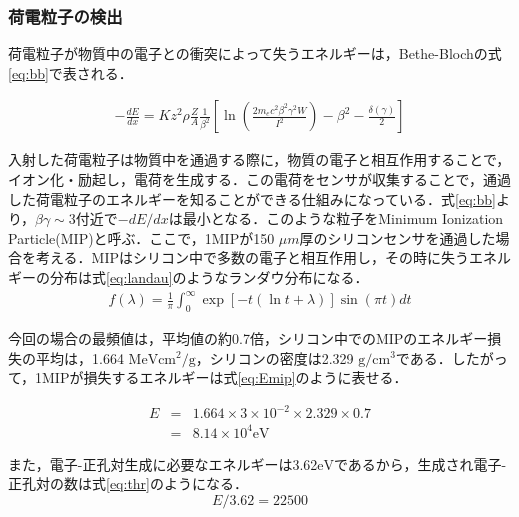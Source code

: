 \subsubsection*{荷電粒子の検出}
荷電粒子が物質中の電子との衝突によって失うエネルギーは，Bethe-Blochの式\ref{eq:bb}で表される．\par
\begin{eqnarray}
  \label{eq:bb}
  - \frac{dE}{dx} = K z^2 \rho \frac{Z}{A} \frac{1}{\beta^2} \left[ \ln \left( \frac{2m_e c^2 \beta^2 \gamma^2 W}{I^2} \right) - \beta^2 - \frac{\delta(\gamma)}{2} \right]
\end{eqnarray}

入射した荷電粒子は物質中を通過する際に，物質の電子と相互作用することで，イオン化・励起し，電荷を生成する．この電荷をセンサが収集することで，通過した荷電粒子のエネルギーを知ることができる仕組みになっている．式\ref{eq:bb}より，$\beta \gamma \sim 3$付近で$-dE/dx$は最小となる．このような粒子をMinimum Ionization Particle(MIP)と呼ぶ．ここで，1MIPが150 $\mu m$厚のシリコンセンサを通過した場合を考える．MIPはシリコン中で多数の電子と相互作用し，その時に失うエネルギーの分布は式\ref{eq:landau}のようなランダウ分布になる．
\begin{eqnarray}
  \label{eq:landau}
  f(\lambda) = \frac{1}{\pi} \int ^{\infty} _0 \exp[-t (\ln t+\lambda) ] \sin(\pi t) dt
\end{eqnarray}

今回の場合の最頻値は，平均値の約0.7倍，シリコン中でのMIPのエネルギー損失の平均は，1.664 $\mathrm{MeV cm^2/g}$，シリコンの密度は2.329 $\mathrm{g/cm^3}$である．したがって，1MIPが損失するエネルギーは式\ref{eq:Emip}のように表せる．

\begin{eqnarray}
  E &=& 1.664 \times 3 \times 10^{-2} \times 2.329 \times 0.7 \nonumber \\
  \label{eq:Emip}
  &=& 8.14 \times 10^4 \mathrm{eV}
\end{eqnarray}

また，電子-正孔対生成に必要なエネルギーは3.62$\mathrm{eV}$であるから，生成され電子-正孔対の数は式\ref{eq:thr}のようになる．
\begin{equation}
  \label{eq:thr}
  E / 3.62 = 22500
\end{equation}


